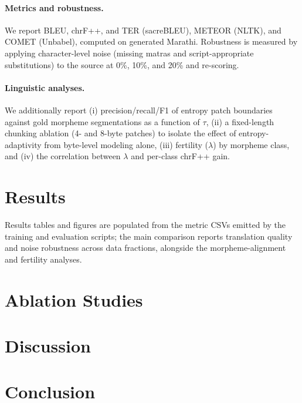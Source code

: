 \documentclass{article}
\begin{document}
\paragraph{Metrics and robustness.}
We report BLEU, chrF++, and TER (sacreBLEU), METEOR (NLTK), and COMET (Unbabel), computed on generated Marathi. Robustness is measured by applying character-level noise (missing matras and script-appropriate substitutions) to the source at 0\%, 10\%, and 20\% and re-scoring.

\paragraph{Linguistic analyses.}
We additionally report (i) precision/recall/F1 of entropy patch boundaries against gold morpheme segmentations as a function of $\tau$, (ii) a fixed-length chunking ablation (4- and 8-byte patches) to isolate the effect of entropy-adaptivity from byte-level modeling alone, (iii) fertility ($\lambda$) by morpheme class, and (iv) the correlation between $\lambda$ and per-class chrF++ gain.

\section{Results}

Results tables and figures are populated from the metric CSVs emitted by the training and evaluation scripts; the main comparison reports translation quality and noise robustness across data fractions, alongside the morpheme-alignment and fertility analyses.

\section{Ablation Studies}

\section{Discussion}

\section{Conclusion}


\end{document}
